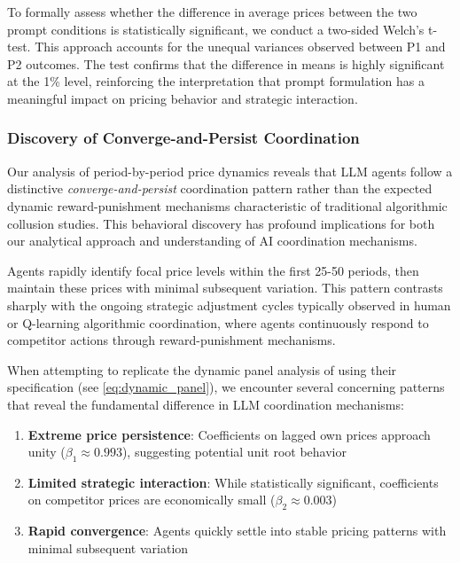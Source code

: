 To formally assess whether the difference in average prices between the two prompt conditions is statistically significant, we conduct a two-sided Welch's t-test. This approach accounts for the unequal variances observed between P1 and P2 outcomes. The test confirms that the difference in means is highly significant at the 1\% level, reinforcing the interpretation that prompt formulation has a meaningful impact on pricing behavior and strategic interaction.

\subsubsection*{Discovery of Converge-and-Persist Coordination}

Our analysis of period-by-period price dynamics reveals that LLM agents follow a distinctive \emph{converge-and-persist} coordination pattern rather than the expected dynamic reward-punishment mechanisms characteristic of traditional algorithmic collusion studies. This behavioral discovery has profound implications for both our analytical approach and understanding of AI coordination mechanisms.

Agents rapidly identify focal price levels within the first 25-50 periods, then maintain these prices with minimal subsequent variation. This pattern contrasts sharply with the ongoing strategic adjustment cycles typically observed in human or Q-learning algorithmic coordination, where agents continuously respond to competitor actions through reward-punishment mechanisms.

When attempting to replicate the dynamic panel analysis of \textcite{fish_algorithmic_2025} using their specification (see \ref{eq:dynamic_panel}), we encounter several concerning patterns that reveal the fundamental difference in LLM coordination mechanisms:

\begin{enumerate}
    \item \textbf{Extreme price persistence}: Coefficients on lagged own prices approach unity ($\beta_1 \approx 0.993$), suggesting potential unit root behavior
    \item \textbf{Limited strategic interaction}: While statistically significant, coefficients on competitor prices are economically small ($\beta_2 \approx 0.003$)
    \item \textbf{Rapid convergence}: Agents quickly settle into stable pricing patterns with minimal subsequent variation
\end{enumerate}

